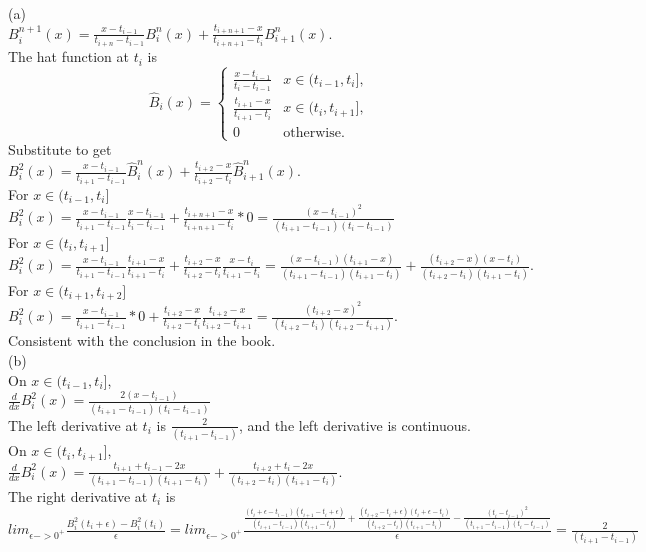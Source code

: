 \documentclass[a4paper]{article}
\begin{document}
(a)\\
$B_i^{n+1}(x) = \frac{x - t_{i-1}}{t_{i+n} - t_{i-1}} B_i^n(x) + \frac{t_{i+n+1} - x}{t_{i+n+1} - t_i} B_{i+1}^n(x). $\\
The hat function at $t_i$ is\\
\[
\hat{B}_i(x) = 
\begin{cases} 
\frac{x - t_{i-1}}{t_i - t_{i-1}} & x \in (t_{i-1}, t_i], \\
\frac{t_{i+1} - x}{t_{i+1} - t_i} & x \in (t_i, t_{i+1}], \\
0 & \text{otherwise}.
\end{cases}
\]
Substitute to get\\
$B_i^{2}(x) = \frac{x - t_{i-1}}{t_{i+1} - t_{i-1}} \hat{B}_i^n(x) + \frac{t_{i+2} - x}{t_{i+2} - t_i} \hat{B}_{i+1}^n(x). $\\
For $x \in (t_{i-1},t_i]$\\
$B_i^{2}(x)=\frac{x - t_{i-1}}{t_{i+1} - t_{i-1}}\frac{x-t_{i-1}}{t_i-t_{i-1}}+\frac{t_{i+n+1} - x}{t_{i+n+1} - t_i}*0=\frac{(x-t_{i-1})^2}{(t_{i+1}-t_{i-1})(t_i-t_{i-1})}$\\
For $x \in (t_{i},t_{i+1}]$\\
$B_i^{2}(x) = \frac{x - t_{i-1}}{t_{i+1} - t_{i-1}} \frac{t_{i+1}-x}{t_{i+1}-t_i} + \frac{t_{i+2} - x}{t_{i+2} - t_i} \frac{x-t_i}{t_{i+1}-t_i}=\frac{(x - t_{i-1})(t_{i+1}-x)}{(t_{i+1} - t_{i-1})(t_{i+1}-t_i)}  + \frac{(t_{i+2} - x)(x-t_i)}{(t_{i+2} - t_i)(t_{i+1}-t_i)} .$\\
For $x \in (t_{i+1},t_{i+2}]$\\
$B_i^{2}(x) =\frac{x - t_{i-1}}{t_{i+1} - t_{i-1}}*0+\frac{t_{i+2} - x}{t_{i+2} - t_i} \frac{t_{i+2}-x}{t_{i+2}-t_{i+1}}=\frac{(t_{i+2}-x)^2}{(t_{i+2} - t_i)(t_{i+2}-t_{i+1})}.$\\
Consistent with the conclusion in the book.\\
(b)\\
On $x \in (t_{i-1},t_i]$,\\
$\frac{d}{dx}B^2_i(x)=\frac{2(x-t_{i-1})}{(t_{i+1}-t_{i-1})(t_i-t_{i-1})}$\\
The left derivative at $t_i$ is $\frac{2}{(t_{i+1}-t_{i-1})}$, and the left derivative is continuous.\\
On $x \in (t_{i},t_{i+1}]$,\\
$\frac{d}{dx}B^2_i(x)= \frac{t_{i+1}+t_{i-1}-2x}{(t_{i+1} - t_{i-1})(t_{i+1}-t_i)}  + \frac{t_{i+2}+t_i-2x}{(t_{i+2} - t_i)(t_{i+1}-t_i)} .$\\
The right derivative at $t_i$ is $lim_{\epsilon->0^{+}}\frac{B^2_i(t_i+\epsilon)-B^2_i(t_i)}{\epsilon}=lim_{\epsilon->0^{+}}\frac{\frac{(t_i+\epsilon - t_{i-1})(t_{i+1}-t_i+\epsilon)}{(t_{i+1} - t_{i-1})(t_{i+1}-t_i)}  + \frac{(t_{i+2} - t_i+\epsilon)(t_i+\epsilon-t_i)}{(t_{i+2} - t_i)(t_{i+1}-t_i)}-\frac{(t_i-t_{i-1})^2}{(t_{i+1}-t_{i-1})(t_i-t_{i-1})}}{\epsilon}=\frac{2}{(t_{i+1}-t_{i-1})}$\\
\end{document}
